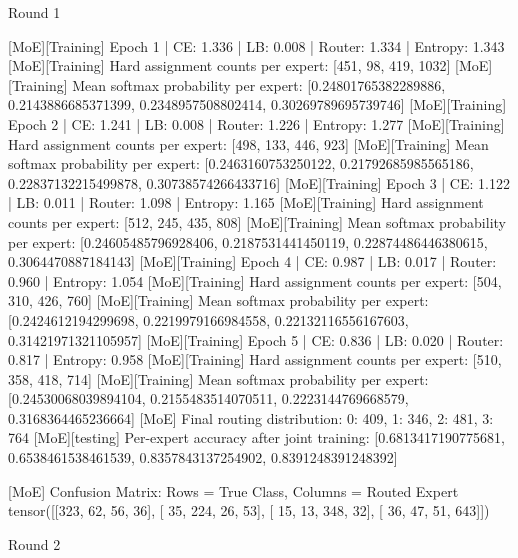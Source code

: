 Round 1

[MoE][Training] Epoch 1 | CE: 1.336 | LB: 0.008 | Router: 1.334 | Entropy: 1.343
[MoE][Training] Hard assignment counts per expert: [451, 98, 419, 1032]
[MoE][Training] Mean softmax probability per expert: [0.24801765382289886, 0.2143886685371399, 0.2348957508802414, 0.30269789695739746]
[MoE][Training] Epoch 2 | CE: 1.241 | LB: 0.008 | Router: 1.226 | Entropy: 1.277
[MoE][Training] Hard assignment counts per expert: [498, 133, 446, 923]
[MoE][Training] Mean softmax probability per expert: [0.2463160753250122, 0.21792685985565186, 0.22837132215499878, 0.30738574266433716]
[MoE][Training] Epoch 3 | CE: 1.122 | LB: 0.011 | Router: 1.098 | Entropy: 1.165
[MoE][Training] Hard assignment counts per expert: [512, 245, 435, 808]
[MoE][Training] Mean softmax probability per expert: [0.24605485796928406, 0.2187531441450119, 0.22874486446380615, 0.3064470887184143]
[MoE][Training] Epoch 4 | CE: 0.987 | LB: 0.017 | Router: 0.960 | Entropy: 1.054
[MoE][Training] Hard assignment counts per expert: [504, 310, 426, 760]
[MoE][Training] Mean softmax probability per expert: [0.2424612194299698, 0.2219979166984558, 0.22132116556167603, 0.31421971321105957]
[MoE][Training] Epoch 5 | CE: 0.836 | LB: 0.020 | Router: 0.817 | Entropy: 0.958
[MoE][Training] Hard assignment counts per expert: [510, 358, 418, 714]
[MoE][Training] Mean softmax probability per expert: [0.24530068039894104, 0.2155483514070511, 0.2223144769668579, 0.3168364465236664]
[MoE] Final routing distribution: {0: 409, 1: 346, 2: 481, 3: 764}
[MoE][testing] Per-expert accuracy after joint training: [0.6813417190775681, 0.6538461538461539, 0.8357843137254902, 0.8391248391248392]

[MoE] Confusion Matrix: Rows = True Class, Columns = Routed Expert
tensor([[323,  62,  56,  36],
[ 35, 224,  26,  53],
[ 15,  13, 348,  32],
[ 36,  47,  51, 643]])

Round 2 

